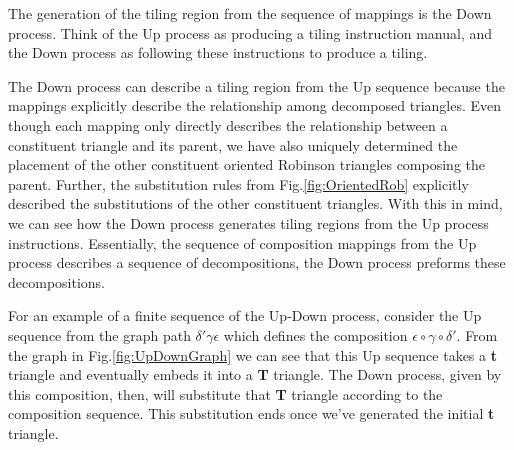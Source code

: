 \documentclass[
  oneside,
  11pt, a4paper,
  footinclude=true,
  headinclude=true,
  cleardoublepage=empty
]{scrbook}
\begin{document}
The generation of the tiling region from the sequence of mappings is the Down process. Think of the Up process as producing a tiling instruction manual, and the Down process as following these instructions to produce a tiling. 

The Down process can describe a tiling region from the Up sequence because the mappings explicitly describe the relationship among decomposed triangles. Even though each mapping only directly describes the relationship between a constituent triangle and its parent, we have also uniquely determined the placement of the other constituent oriented Robinson triangles composing the parent. Further, the substitution rules from Fig.\ref{fig:OrientedRob} explicitly described the substitutions of the other constituent triangles. With this in mind, we can see how the Down process generates tiling regions from the Up process instructions. Essentially, the sequence of composition mappings from the Up process describes a sequence of decompositions, the Down process preforms these decompositions.

For an example of a finite sequence of the Up-Down process, consider the Up sequence from the graph path $\delta'\gamma\epsilon$ which defines the composition $\epsilon \circ \gamma \circ \delta'$. From the graph in Fig.\ref{fig:UpDownGraph} we can see that this Up sequence takes a \textbf{t} triangle and eventually embeds it into a \textbf{T} triangle. The Down process, given by this composition, then, will substitute that \textbf{T} triangle according to the composition sequence. This substitution ends once we've generated the initial \textbf{t} triangle. 
\end{document}
